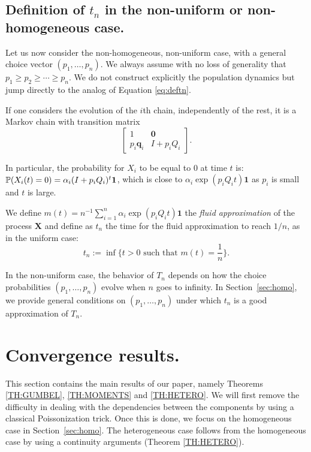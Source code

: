 \documentclass{aptpub}
\newcommand\proba[1]{\mathchoice{\bproba{#1}}{\sproba{#1}}{\sproba{#1}}{\sproba{#1}}}
\newcommand\bproba[1]{\mathbb{P}\left(#1\right)}
\newcommand\sproba[1]{\mathbb{P}(#1)}
\newcommand\bX{\mathbf{X}}
\begin{document}
\subsection{Definition of $t_n$ in the non-uniform or non-homogeneous
  case.}
\label{ssec:defhetero}

Let us now consider the non-homogeneous, non-uniform case, with a
general choice vector $(p_1,\dots,p_n)$.  We always assume with no
loss of generality that $p_1 \geq p_2\geq \cdots \geq p_n$.  We do not
construct explicitly the population dynamics but jump directly to the
analog of Equation \eqref{eq:deftn}.

If one considers the evolution of the $i$th chain, independently of
the rest, it is a Markov chain with transition matrix
\begin{equation*}
  \left[
    \begin{array}{cc}
      1&\mathbf{0}\\
      p_i \mathbf{q}_i & I+ p_i Q_i
    \end{array}
  \right].
\end{equation*}

In particular, the probability for $X_i$ to be equal to $0$ at time
$t$ is:
$\proba{X_i(t)=0} = \alpha_i(I+p_iQ_i)^t\mathbf{1}$, 
which is close to $\alpha_i\exp(p_iQ_it)\mathbf{1}$ as $p_i$ is small
and $t$ is large.

We define $m(t)=n^{-1}\sum_{i=1}^n \alpha_i \exp(p_iQ_it)\mathbf{1}$ the
\emph{fluid approximation} of the process $\bX$ and define as $t_n$
the time for the fluid approximation to reach $1/n$, as in the uniform
case:
\begin{equation}
  t_n := \inf\{t>0 \text{ such that } m(t)=\frac1n\}.
  \label{eq:t_n}
\end{equation}

In the non-uniform case, the behavior of $T_n$ depends on how the
choice probabilities $(p_1,\dots,p_n)$ evolve when $n$ goes to
infinity.  In Section~\ref{sec:homo}, we provide general conditions on
$(p_1,\dots,p_n)$ under which $t_n$ is a good approximation of $T_n$.



\section{Convergence results.}
\label{sec:results}


This section contains the main results of our paper, namely Theorems
\ref{TH:GUMBEL}, \ref{TH:MOMENTS} and \ref{TH:HETERO}. We will first
remove the difficulty in dealing with the dependencies between the
components by using a classical Poissonization trick. Once this is
done, we focus on the homogeneous case in Section~\ref{sec:homo}. The
heterogeneous case follows from the homogeneous case by using a
continuity arguments (Theorem \ref{TH:HETERO}).
\end{document}
